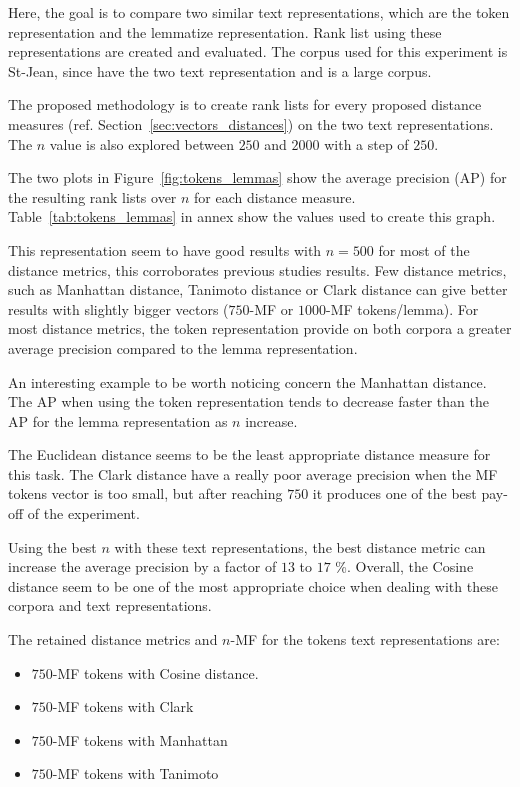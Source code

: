 Here, the goal is to compare two similar text representations, which are the token representation and the lemmatize representation.
Rank list using these representations are created and evaluated.
The corpus used for this experiment is St-Jean, since have the two text representation and is a large corpus.

The proposed methodology is to create rank lists for every proposed distance measures (ref. Section~\ref{sec:vectors_distances}) on the two text representations.
The $n$ value is also explored between $250$ and $2000$ with a step of $250$.

The two plots in Figure~\ref{fig:tokens_lemmas} show the average precision (AP) for the resulting rank lists over $n$ for each distance measure.
Table~\ref{tab:tokens_lemmas} in annex show the values used to create this graph.

This representation seem to have good results with $n=500$ for most of the distance metrics, this corroborates previous studies results.
Few distance metrics, such as Manhattan distance, Tanimoto distance or Clark distance can give better results with slightly bigger vectors ($750$-MF or $1000$-MF tokens/lemma).
For most distance metrics, the token representation provide on both corpora a greater average precision compared to the lemma representation.

An interesting example to be worth noticing concern the Manhattan distance.
The AP when using the token representation tends to decrease faster than the AP for the lemma representation as $n$ increase.

The Euclidean distance seems to be the least appropriate distance measure for this task.
The Clark distance have a really poor average precision when the MF tokens vector is too small, but after reaching $750$ it produces one of the best pay-off of the experiment.

Using the best $n$ with these text representations, the best distance metric can increase the average precision by a factor of $13$ to $17$ \%.
Overall, the Cosine distance seem to be one of the most appropriate choice when dealing with these corpora and text representations.

The retained distance metrics and $n$-MF for the tokens text representations are:
\begin{itemize}
  \item $750$-MF tokens with Cosine distance.
  \item $750$-MF tokens with Clark
  \item $750$-MF tokens with Manhattan
  \item $750$-MF tokens with Tanimoto
\end{itemize}

